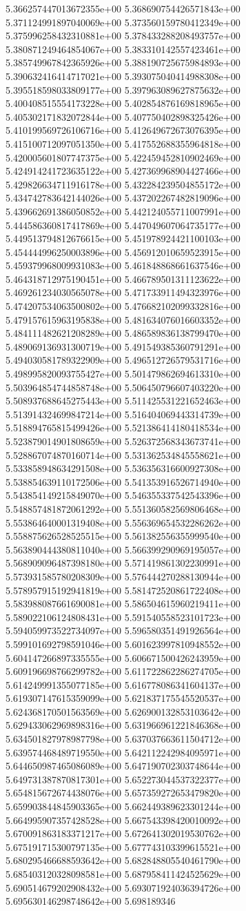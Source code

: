 5.366257447013672355e+00	5.368690754426571843e+00	5.371124991897040069e+00	5.373560159780412349e+00	5.375996258432310881e+00	5.378433288208493757e+00	5.380871249464854067e+00	5.383310142557423461e+00	5.385749967842365926e+00	5.388190725675984893e+00	5.390632416414717021e+00	5.393075040414988308e+00	5.395518598033809177e+00	5.397963089627875632e+00	5.400408515554173228e+00	5.402854876169818965e+00	5.405302171832072844e+00	5.407750402898325426e+00	5.410199569726106716e+00	5.412649672673076395e+00	5.415100712097051350e+00	5.417552688355964818e+00	5.420005601807747375e+00	5.422459452810902469e+00	5.424914241723635122e+00	5.427369968904427466e+00	5.429826634711916178e+00	5.432284239504855172e+00	5.434742783642144026e+00	5.437202267482819096e+00	5.439662691386050852e+00	5.442124055711007991e+00	5.444586360817417869e+00	5.447049607064735177e+00	5.449513794812676615e+00	5.451978924421100103e+00	5.454444996250003896e+00	5.456912010659523915e+00	5.459379968009931083e+00	5.461848868661637546e+00	5.464318712975190451e+00	5.466789501311123622e+00	5.469261234030565078e+00	5.471733911494323976e+00	5.474207534063500802e+00	5.476682102099332816e+00	5.479157615963195838e+00	5.481634076016603352e+00	5.484111482621208289e+00	5.486589836138799470e+00	5.489069136931300719e+00	5.491549385360791291e+00	5.494030581789322909e+00	5.496512726579531716e+00	5.498995820093755427e+00	5.501479862694613310e+00	5.503964854744858748e+00	5.506450796607403220e+00	5.508937688645275443e+00	5.511425531221652463e+00	5.513914324699847214e+00	5.516404069443314739e+00	5.518894765815499426e+00	5.521386414180418534e+00	5.523879014901808659e+00	5.526372568343673741e+00	5.528867074870160714e+00	5.531362534845558621e+00	5.533858948634291508e+00	5.536356316600927308e+00	5.538854639110172506e+00	5.541353916526714940e+00	5.543854149215849070e+00	5.546355337542543396e+00	5.548857481872061292e+00	5.551360582569806468e+00	5.553864640001319408e+00	5.556369654532286262e+00	5.558875626528525515e+00	5.561382556355999540e+00	5.563890444380811040e+00	5.566399290969195057e+00	5.568909096487398180e+00	5.571419861302230991e+00	5.573931585780208309e+00	5.576444270288130944e+00	5.578957915192941819e+00	5.581472520861722408e+00	5.583988087661690081e+00	5.586504615960219411e+00	5.589022106124808431e+00	5.591540558523101723e+00	5.594059973522734097e+00	5.596580351491926564e+00	5.599101692798591046e+00	5.601623997810948552e+00	5.604147266897335555e+00	5.606671500426243959e+00	5.609196698766299782e+00	5.611722862286274705e+00	5.614249991355077185e+00	5.616778086341604137e+00	5.619307147615359099e+00	5.621837175545520537e+00	5.624368170501563569e+00	5.626900132853103642e+00	5.629433062969898316e+00	5.631966961221846368e+00	5.634501827978987798e+00	5.637037663611504712e+00	5.639574468489719550e+00	5.642112242984095971e+00	5.644650987465086089e+00	5.647190702303748644e+00	5.649731387870817301e+00	5.652273044537322377e+00	5.654815672674438076e+00	5.657359272653479820e+00	5.659903844845903365e+00	5.662449389623301244e+00	5.664995907357428528e+00	5.667543398420010092e+00	5.670091863183371217e+00	5.672641302019530762e+00	5.675191715300797135e+00	5.677743103399615521e+00	5.680295466688593642e+00	5.682848805540461790e+00	5.685403120328098581e+00	5.687958411424525629e+00	5.690514679202908432e+00	5.693071924036394726e+00	5.695630146298748642e+00	5.698189346